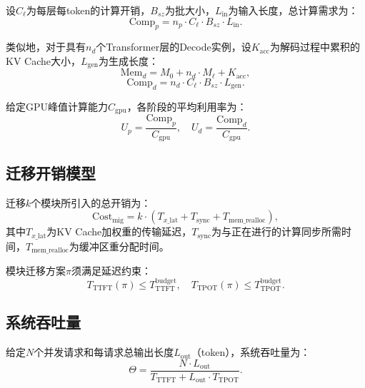 设$C_\ell$为每层每token的计算开销，$B_{sz}$为批大小，$L_{\text{in}}$为输入长度，总计算需求为：
\begin{equation}
    \text{Comp}_p = n_p \cdot C_\ell \cdot B_{sz} \cdot L_{\text{in}}.
    \label{eq:prefill_comp}
\end{equation}

类似地，对于具有$n_d$个Transformer层的Decode实例，设$K_{\text{acc}}$为解码过程中累积的KV Cache大小，$L_{\text{gen}}$为生成长度：
\begin{equation}
    \text{Mem}_d = M_0 + n_d \cdot M_\ell + K_{\text{acc}},
    \label{eq:decode_mem}
\end{equation}
\begin{equation}
    \text{Comp}_d = n_d \cdot C_\ell \cdot B_{sz} \cdot L_{\text{gen}}.
    \label{eq:decode_comp}
\end{equation}

给定GPU峰值计算能力$C_{\text{gpu}}$，各阶段的平均利用率为：
\begin{equation}
    U_p = \frac{\text{Comp}_p}{C_{\text{gpu}}}, \quad U_d = \frac{\text{Comp}_d}{C_{\text{gpu}}}.
    \label{eq:stage_utilization}
\end{equation}

\subsection{迁移开销模型}

迁移$k$个模块所引入的总开销为：
\begin{equation}
    \text{Cost}_{\text{mig}} = k \cdot \left(T_{x\_\text{lat}} + T_{\text{sync}} + T_{\text{mem\_realloc}}\right),
    \label{eq:migration_cost}
\end{equation}
其中$T_{x\_\text{lat}}$为KV Cache加权重的传输延迟，$T_{\text{sync}}$为与正在进行的计算同步所需时间，$T_{\text{mem\_realloc}}$为缓冲区重分配时间。

模块迁移方案$\pi$须满足延迟约束：
\begin{equation}
    T_{\text{TTFT}}(\pi) \leq T^{\text{budget}}_{\text{TTFT}}, \quad
    T_{\text{TPOT}}(\pi) \leq T^{\text{budget}}_{\text{TPOT}}.
    \label{eq:latency_constraint}
\end{equation}

\subsection{系统吞吐量}

给定$N$个并发请求和每请求总输出长度$L_{\text{out}}$（token），系统吞吐量为：
\begin{equation}
    \Theta = \frac{N \cdot L_{\text{out}}}{T_{\text{TTFT}} + L_{\text{out}} \cdot T_{\text{TPOT}}}
    \label{eq:throughput}.
\end{equation}

